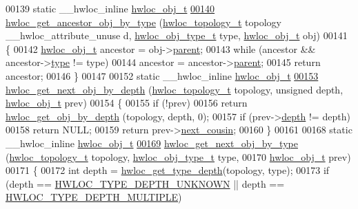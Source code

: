 \begin{DoxyCode}
00139 \textcolor{keyword}{static} \_\_hwloc\_inline \hyperlink{a00016}{hwloc_obj_t}
\hypertarget{a00031_source_l00140}{}\hyperlink{a00053_gac93e1a95a71add57ac841daef1b94e5e}{00140} \hyperlink{a00053_gac93e1a95a71add57ac841daef1b94e5e}{hwloc_get_ancestor_obj_by_type} (\hyperlink{a00039_ga9d1e76ee15a7dee158b786c30b6a6e38}{hwloc_topology_t} topology \_\_hwloc\_attribute\_unuse
      d, \hyperlink{a00041_gacd37bb612667dc437d66bfb175a8dc55}{hwloc_obj_type_t} type, \hyperlink{a00016}{hwloc_obj_t} obj)
00141 \{
00142   \hyperlink{a00016}{hwloc_obj_t} ancestor = obj->\hyperlink{a00016_adc494f6aed939992be1c55cca5822900}{parent};
00143   \textcolor{keywordflow}{while} (ancestor && ancestor->\hyperlink{a00016_acc4f0803f244867e68fe0036800be5de}{type} != type)
00144     ancestor = ancestor->\hyperlink{a00016_adc494f6aed939992be1c55cca5822900}{parent};
00145   \textcolor{keywordflow}{return} ancestor;
00146 \}
00147 
00152 \textcolor{keyword}{static} \_\_hwloc\_inline \hyperlink{a00016}{hwloc_obj_t}
\hypertarget{a00031_source_l00153}{}\hyperlink{a00053_gab7c1dce3f42ece5bfa621e87cf332418}{00153} \hyperlink{a00053_gab7c1dce3f42ece5bfa621e87cf332418}{hwloc_get_next_obj_by_depth} (\hyperlink{a00039_ga9d1e76ee15a7dee158b786c30b6a6e38}{hwloc_topology_t} topology, \textcolor{keywordtype}{unsigned} depth, 
      \hyperlink{a00016}{hwloc_obj_t} prev)
00154 \{
00155   \textcolor{keywordflow}{if} (!prev)
00156     \textcolor{keywordflow}{return} \hyperlink{a00047_gaedd78240b0c1108355586a268ec5a697}{hwloc_get_obj_by_depth} (topology, depth, 0);
00157   \textcolor{keywordflow}{if} (prev->\hyperlink{a00016_a9d82690370275d42d652eccdea5d3ee5}{depth} != depth)
00158     \textcolor{keywordflow}{return} NULL;
00159   \textcolor{keywordflow}{return} prev->\hyperlink{a00016_a85a788017457129589318b6c39451acf}{next_cousin};
00160 \}
00161 
00168 \textcolor{keyword}{static} \_\_hwloc\_inline \hyperlink{a00016}{hwloc_obj_t}
\hypertarget{a00031_source_l00169}{}\hyperlink{a00053_ga5f08ceb69375341e73563cfe2e77534e}{00169} \hyperlink{a00053_ga5f08ceb69375341e73563cfe2e77534e}{hwloc_get_next_obj_by_type} (\hyperlink{a00039_ga9d1e76ee15a7dee158b786c30b6a6e38}{hwloc_topology_t} topology, \hyperlink{a00041_gacd37bb612667dc437d66bfb175a8dc55}{hwloc_obj_type_t} type,
00170                    \hyperlink{a00016}{hwloc_obj_t} prev)
00171 \{
00172   \textcolor{keywordtype}{int} depth = \hyperlink{a00046_gaea7c64dd59467f5201ba87712710b14d}{hwloc_get_type_depth}(topology, type);
00173   \textcolor{keywordflow}{if} (depth == \hyperlink{a00046_ggaf4e663cf42bbe20756b849c6293ef575a0565ab92ab72cb0cec91e23003294aad}{HWLOC_TYPE_DEPTH_UNKNOWN} || depth == \hyperlink{a00046_ggaf4e663cf42bbe20756b849c6293ef575ae99465995cacde6c210d5fc2e409798c}{HWLOC_TYPE_DEPTH_MULTIPLE})

\end{DoxyCode}
